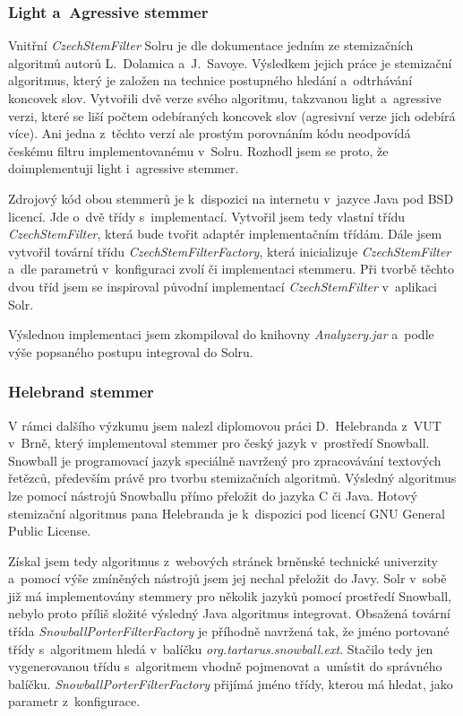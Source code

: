 \subsubsection{Light a~Agressive stemmer}
Vnitřní \emph{CzechStemFilter} Solru je dle dokumentace\cite{sorl:doc} jedním ze stemizačních algoritmů autorů L.~Dolamica a~J.~Savoye. Výsledkem jejich práce \cite{Dolamic:2009:Stemming} je stemizační algoritmus, který je založen na technice postupného hledání a~odtrhávání koncovek slov. Vytvořili dvě verze svého algoritmu, takzvanou light a~agressive verzi, které se liší počtem odebíraných koncovek slov (agresivní verze jich odebírá více). Ani jedna z~těchto verzí ale prostým porovnáním kódu neodpovídá českému filtru implementovanému v~Solru. Rozhodl jsem se proto, že doimplementuji light i~agressive stemmer.

Zdrojový kód obou stemmerů je k~dispozici na internetu v~jazyce Java pod BSD licencí. Jde o~dvě třídy s~implementací. Vytvořil jsem tedy vlastní třídu \emph{CzechStemFilter}, která bude tvořit adaptér implementačním třídám. Dále jsem vytvořil tovární třídu \emph{CzechStemFilterFactory}, která inicializuje \emph{CzechStemFilter} a~dle parametrů v~konfiguraci zvolí  či  implementaci stemmeru. Při tvorbě těchto dvou tříd jsem se inspiroval původní implementací \emph{CzechStemFilter} v~aplikaci Solr.

Výslednou implementaci jsem zkompiloval do knihovny \emph{Analyzery.jar} a~podle výše popsaného postupu integroval do Solru.

\subsubsection{Helebrand stemmer}
V rámci dalšího výzkumu jsem nalezl diplomovou práci D.~Helebranda z~VUT v~Brně\cite{Helebrand:2010:Stemming}, který implementoval stemmer pro český jazyk v~prostředí Snowball. Snowball je programovací jazyk speciálně navržený pro zpracovávání textových řetězců, především právě pro tvorbu stemizačních algoritmů. Výsledný algoritmus lze pomocí nástrojů Snowballu přímo přeložit do jazyka C či Java. Hotový stemizační algoritmus pana Helebranda je k~dispozici pod licencí GNU General Public License.

Získal jsem tedy algoritmus z~webových stránek brněnské technické univerzity a~pomocí výše zmíněných nástrojů jsem jej nechal přeložit do Javy. Solr v~sobě již má implementovány stemmery pro několik jazyků pomocí prostředí Snowball, nebylo proto příliš složité výsledný Java algoritmus integrovat. Obsažená tovární třída \emph{SnowballPorterFilterFactory} je příhodně navržená tak, že jméno  portované třídy s~algoritmem hledá v~balíčku \emph{org.tartarus.snowball.ext}. Stačilo tedy jen vygenerovanou třídu s~algoritmem vhodně pojmenovat a~umístit do správného balíčku. \emph{SnowballPorterFilterFactory} přijímá jméno třídy, kterou má hledat, jako parametr z~konfigurace.

